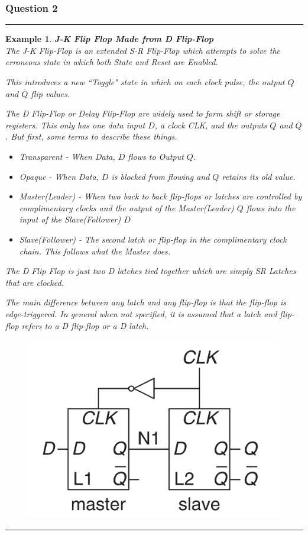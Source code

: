 \documentclass[12pt]{article}
\newtheorem{example}{Example}
\newenvironment{examp}
{
	\vspace{.5cm}
	\hrule
\begin{example}\upshape}
	{\hrule
		\vspace{0.5cm}
\end{example}}
\begin{document}
\subsubsection*{Question 2}
\begin{examp}
\vspace{.5cm}
\textbf{J-K Flip Flop Made from D Flip-Flop}\\

The \textit{J-K Flip-Flop} is an extended \textit{S-R Flip-Flop} which
attempts to solve the erroneous state in which both State and Reset are
Enabled.

This introduces a new ``Toggle" state in which on each clock pulse, the output
\(Q\) and \(\overline{Q}\) flip values.

The \textit{D Flip-Flop} or \textit{Delay Flip-Flop} are widely used to form
shift or storage registers. This only has one data input \(D\), a clock CLK, and
the outputs \(Q\) and \(\overline{Q}\). But first, some terms to describe
these \textit{things}.
\begin{itemize}
	\item Transparent - When Data, \(D\) flows to Output \(Q\).
	\item Opaque - When Data, \(D\) is blocked from flowing and \(Q\) retains its
	      old value.
	\item Master(Leader) - When two back to back flip-flops or latches are
	      controlled by complimentary clocks and the output of the Master(Leader)
	      \(Q\) flows into the input of the Slave(Follower) \(D\)
	\item Slave(Follower) - The second latch or flip-flop in the complimentary clock
	      chain. This follows what the Master does.
\end{itemize}
The D Flip Flop is just two D latches tied together which are simply SR
Latches that are clocked.

The main difference between any latch and any
flip-flop is that the flip-flop is \textit{edge-triggered}. In general when
not specified, it is assumed that a \textit{latch} and \textit{flip-flop}
refers to a D flip-flop or a D latch.
\begin{figure}[H]
	\centering
	\includegraphics[scale=.3]{examp082.png}
\end{figure}


\end{examp}
\end{document}
